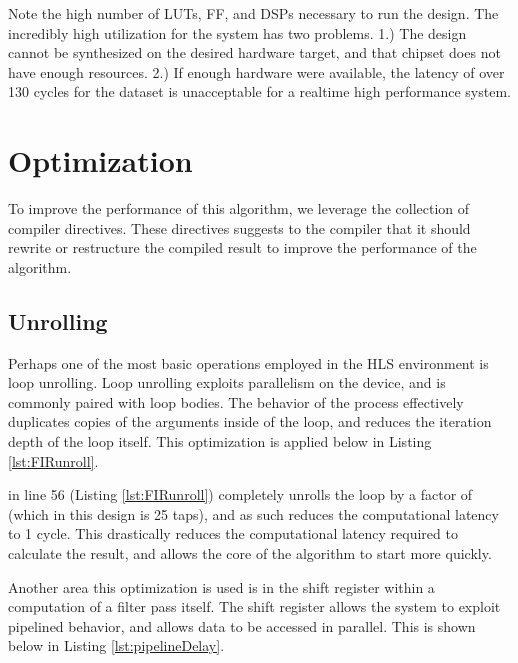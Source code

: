 \documentclass[11pt]{report}
\begin{document}
 Note the high number of LUTs, FF, and DSPs necessary to run the design. The incredibly high utilization for the system has two problems. 1.) The design cannot be synthesized on the desired hardware target, and that chipset does not have enough resources. 2.) If enough hardware were available, the latency of over 130 cycles for the dataset is unacceptable for a realtime high performance system.
 
 \section{Optimization}
 To improve the performance of this algorithm, we leverage the  collection of compiler directives. These directives suggests to the compiler that it should rewrite or restructure the compiled result to improve the performance of the algorithm.
 
 \subsection{Unrolling}
Perhaps one of the most basic operations employed in the HLS environment is loop unrolling. Loop unrolling exploits parallelism on the device, and is commonly paired with  loop bodies. The behavior of the process effectively duplicates copies of the arguments inside of the loop, and reduces the iteration depth of the loop itself. This optimization is applied below in Listing \ref{lst:FIRunroll}.

\begin{singlespace}
    
\end{singlespace}

 in line 56 (Listing \ref{lst:FIRunroll}) completely unrolls the loop by a factor of  (which in this design is 25 taps), and as such reduces the computational latency to 1 cycle. This drastically reduces the computational latency required to calculate the result, and allows the core of the algorithm to start more quickly.

Another area this optimization is used is in the shift register within a computation of a filter pass itself. The shift register allows the system to exploit pipelined behavior, and allows data to be accessed in parallel. This is shown below in Listing \ref{lst:pipelineDelay}.
\end{document}
